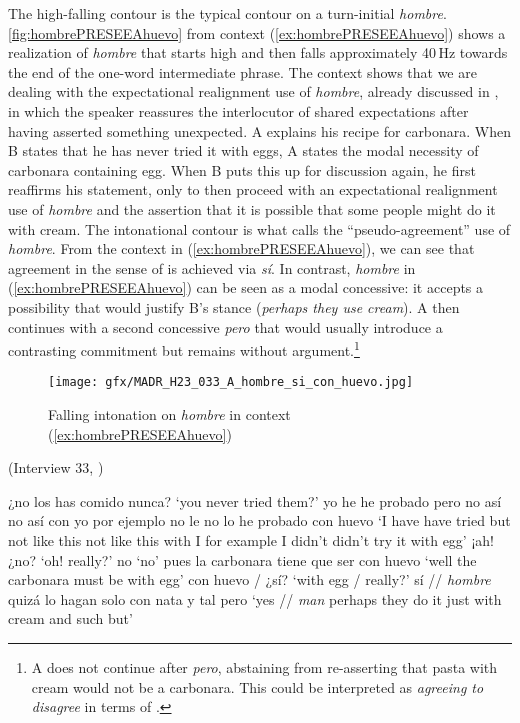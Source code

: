 The high-falling contour is the typical contour on a turn-initial \textit{hombre}.  \autoref{fig:hombrePRESEEAhuevo} from context (\ref{ex:hombrePRESEEAhuevo}) shows a realization of \textit{hombre} that starts high and then falls approximately 40\,Hz towards the end of the one-word intermediate phrase. The context shows that we are dealing with the expectational realignment use of \textit{hombre}, already discussed in , in which the speaker reassures the interlocutor of shared expectations after having asserted something unexpected. A explains his recipe for carbonara. When B states that he has never tried it with eggs, A states the modal necessity of carbonara containing egg. When B puts this up for discussion again, he first reaffirms his statement, only to then proceed with an expectational realignment use of \textit{hombre} and the assertion that it is possible that some people might do it with cream. The intonational contour is what \citet[32]{Briz.2012} calls the ``pseudo-agreement'' use of \textit{hombre}. From the context in (\ref{ex:hombrePRESEEAhuevo}), we can see that agreement in the sense of \citet{FarkasBruce.2010} is achieved via \textit{sí}. In contrast, \textit{hombre} in (\ref{ex:hombrePRESEEAhuevo}) can be seen as a modal concessive: it accepts a possibility that would justify B's stance (\textit{perhaps they use cream}). A then continues with a second concessive \textit{pero} that would usually introduce a contrasting commitment \citep{CouperKuhlenThompson.2000} but remains without argument.\footnote{A does not continue after \textit{pero}, abstaining from re-asserting that pasta with cream would not be a carbonara. This could be interpreted as \textit{agreeing to disagree} in terms of \citet{FarkasBruce.2010}.}\largerpage[-1]\pagebreak

\begin{figure}[p]
	\texttt{[image: gfx/MADR\_H23\_033\_A\_hombre\_si\_con\_huevo.jpg]}
	\caption[Falling intonation on \textit{hombre} in context (\ref{ex:hombrePRESEEAhuevo})]{Falling intonation on \textit{hombre} in context (\ref{ex:hombrePRESEEAhuevo}) \href{https://osf.io/9e73y/}{\faVolumeUp} \label{fig:hombrePRESEEAhuevo}}
\end{figure}\clearpage

\begin{exe}
	\ex (Interview 33, \cite{PRESEEA.20142020})\label{ex:hombrePRESEEAhuevo}
	\begin{xlist}[A:]
	  ¿no los has comido nunca?  
	\glt `you never tried them?'
	 yo he he probado pero no así no así con yo por ejemplo no le no lo he probado con huevo 
	\glt `I have have tried but not like this not like this with I for example I didn't didn't try it with egg'
	 ¡ah! ¿no?
	\glt `oh! really?'
	 no
	\glt `no'
	  pues la carbonara tiene que ser con huevo 
	\glt  `well the carbonara must be with egg'
	 con huevo / ¿sí? 
	\glt `with egg / really?'
	 sí // \textit{hombre} quizá lo hagan solo con nata y tal pero
	\glt `yes // \textit{man} perhaps they do it just with cream and such but'
	\end{xlist}
\end{exe}

